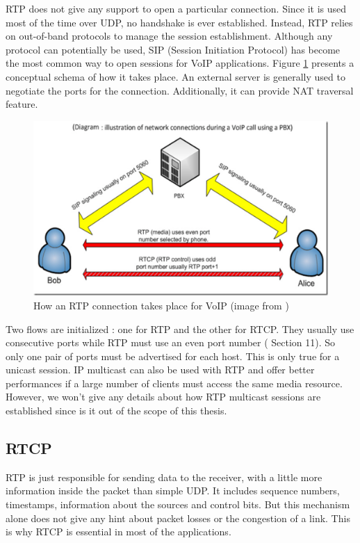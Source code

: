 RTP does not give any support to open a particular connection. Since it is used most of the time over UDP, no handshake is ever established. Instead, RTP relies on out-of-band protocols to manage the session establishment. Although any protocol can potentially be used, SIP (Session Initiation Protocol) has become the most common way to open sessions for VoIP applications. Figure \ref{fig:rtp-sip} presents a conceptual schema of how it takes place. An external server is generally used to negotiate the ports for the connection. Additionally, it can provide NAT traversal feature.
\newpage
\begin{figure}[!ht]
\centering
\includegraphics[width=0.9\linewidth]{images/rtp_sip}
\caption{How an RTP connection takes place for VoIP (image from \cite{rtp-sip})}
\label{fig:rtp-sip}
\end{figure}


Two flows are initialized : one for RTP and the other for RTCP. They usually use consecutive ports while RTP must use an even port number (\cite{RFC3550} Section 11). So only one pair of ports must be advertised for each host. This is only true for a unicast session. IP multicast can also be used with RTP and offer better performances if a large number of clients must access the same media resource. However, we won't give any details about how RTP multicast sessions are established since is it out of the scope of this thesis.

\subsection{RTCP}

RTP is just responsible for sending data to the receiver, with a little more information inside the packet than simple UDP. It includes sequence numbers, timestamps, information about the sources and control bits. But this mechanism alone does not give any hint about packet losses or the congestion of a link. This is why RTCP is essential in most of the applications.

